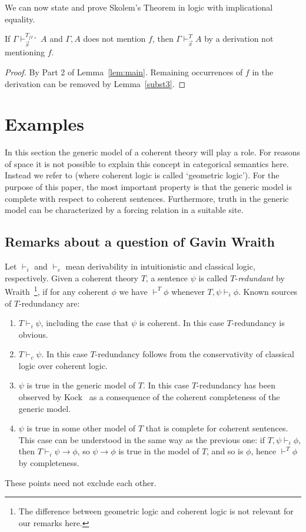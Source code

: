 \documentclass{fundam}
\begin{document}
We can now state and prove Skolem's Theorem in logic with implicational equality.

\begin{theorem}\label{thm:skolemwith=}
If $\Gamma\vdash_{\vec{x}}^{T_{f\!I\!{+}}} A$ and $\Gamma,A$ does not mention $f$,
then $\Gamma\vdash_{\vec{x}}^{T} A$ by a derivation not mentioning $f$.
\end{theorem}
\begin{proof}
By Part 2 of Lemma~\ref{lem:main}. Remaining occurrences of $f$
in the derivation can be removed by Lemma~\ref{subst3}.
\end{proof}

\section{Examples}

In this section the generic model of a coherent theory will play a role.
For reasons of space it is not possible to explain this concept
in categorical semantics here. Instead we refer to \cite{MLM94}
(where coherent logic is called `geometric logic').
For the purpose of this paper, the most important property is that 
the generic model is complete with respect to coherent sentences.
Furthermore, truth in the generic model can be characterized
by a forcing relation in a suitable site. 

\subsection{Remarks about a question of Gavin Wraith}

Let $\vdash_i$ and $\vdash_c$ mean derivability in intuitionistic and classical logic,
respectively. Given a coherent theory $T$, a sentence $\psi$ 
is called $T$-\emph{redundant} by
Wraith~\cite[p. 336]{Wraith}\footnote{The difference
between geometric logic and coherent logic is not relevant for our remarks here.},
if for any coherent $\phi$ we have
$\vdash^T \phi$ whenever $T,\psi \vdash_i \phi$.
Known sources of $T$-redundancy are:
\begin{enumerate}
\item $T \vdash_i \psi$, including the case that $\psi$ is coherent.
In this case $T$-redundancy is obvious.
\item $T \vdash_c \psi$. In this case $T$-redundancy follows from the conservativity
of classical logic over coherent logic.
\item $\psi$ is true in the generic model of $T$. In this case $T$-redundancy
has been observed by Kock~\cite{Kock1976} as a consequence of the coherent 
completeness of the generic model.
\item $\psi$ is true in some other model of $T$ that is complete for coherent 
sentences. This case can be understood in the same way as the previous one: 
if $T,\psi \vdash_i \phi$, then $T \vdash_i \psi\to\phi$, so $\psi\to\phi$ is true in
the model of $T$, and so is $\phi$, hence $\vdash^{T} \phi$ by completeness.
\end{enumerate}
These points need not exclude each other.
\end{document}
